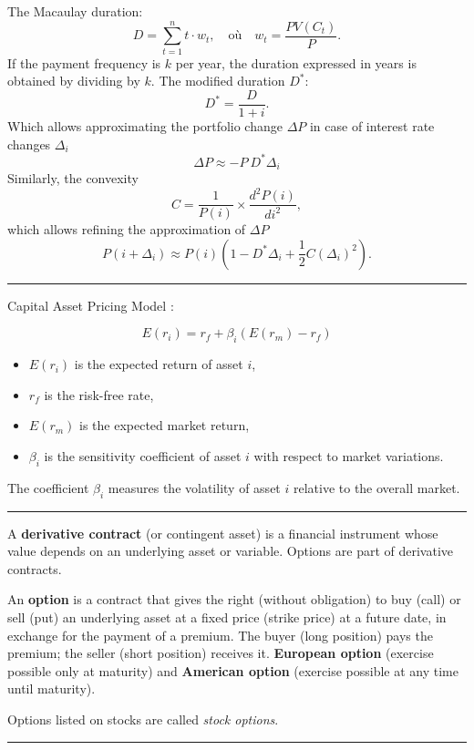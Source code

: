 \begin{f}

The Macaulay duration:
\[ 		
D = \sum_{t=1}^{n} t \cdot w_t, \quad \text{où} \quad w_t = \frac{PV(C_t)}{P}.
 \]	
If the payment frequency is $k$ per year, the duration expressed in years is obtained by dividing by $k$.
The modified duration $D^*$:
\[ 	
D^* = \frac{D}{1 + i}.
 \]
 Which allows approximating the portfolio change $\Delta P$ in case of interest rate changes $\Delta_i$
\[ 
\Delta P \approx -P\ D^* \Delta_i 
 \]
Similarly, the convexity
\[ 	
C = \frac{1}{P(i)} \times \frac{d^2 P(i)}{di^2},
 \]
which allows refining the approximation of $\Delta P$
\[ 	
P(i + \Delta_i) \approx P(i) \left( 1 -D^*\Delta_i + \frac{1}{2} C (\Delta_i)^2 \right).
 \]
\end{f}
\hrule



\begin{f}[CAPM]
  Capital Asset Pricing Model :

\[
E(r_i) = r_f + \beta_i (E(r_m) - r_f)
\]

\begin{itemize}
    \item \( E(r_i) \) is the expected return of asset \( i \),
    \item \( r_f \) is the risk-free rate,
    \item \( E(r_m) \) is the expected market return,
    \item \( \beta_i \) is the sensitivity coefficient of asset \( i \) with respect to market variations.
\end{itemize}

The coefficient \( \beta_i \) measures the volatility of asset \( i \) relative to the overall market.

\end{f}
\hrule


\begin{f}

A \textbf{derivative contract} (or contingent asset) is a financial instrument whose value depends on an underlying asset or variable. Options are part of derivative contracts.


An \textbf{option} is a contract that gives the right (without obligation) to buy (call) or sell (put) an underlying asset at a fixed price (strike price) at a future date, in exchange for the payment of a premium.
The buyer (long position) pays the premium; the seller (short position) receives it. \textbf{European option} (exercise possible only at maturity) and  
 \textbf{American option} (exercise possible at any time until maturity).

Options listed on stocks are called \textit{stock options}.

\end{f}
\hrule


